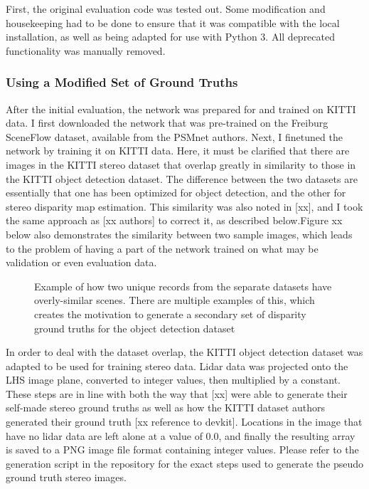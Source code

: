 First, the original evaluation code was tested out. Some modification and housekeeping had to be done to ensure that it was compatible with the local installation, as well as being adapted for use with Python 3. All deprecated functionality was manually removed.

\subsubsection{Using a Modified Set of Ground Truths}
After the initial evaluation, the network was prepared for and trained on KITTI data. I first downloaded the network that was pre-trained on the Freiburg SceneFlow dataset, available from the PSMnet authors. Next, I finetuned the network by training it on KITTI data. Here, it must be clarified that there are images in the KITTI stereo dataset that overlap greatly in similarity to those in the KITTI object detection dataset. The difference between the two datasets are essentially that one has been optimized for object detection, and the other for stereo disparity map estimation. This similarity was also noted in [xx], and I took the same approach as [xx authors] to correct it, as described below.Figure xx below also demonstrates the similarity between two sample images, which leads to the problem of having a part of the network trained on what may be validation or even evaluation data.

\begin{figure}[H]
    \centering
    \label{similarity_stereo_objdet}
    \caption{Example of how two unique records from the separate datasets have overly-similar scenes. There are multiple examples of this, which creates the motivation to generate a secondary set of disparity ground truths for the object detection dataset}
\end{figure}

In order to deal with the dataset overlap, the KITTI object detection dataset was adapted to be used for training stereo data. Lidar data was projected onto the LHS image plane, converted to integer values, then multiplied by a constant. These steps are in line with both the way that [xx] were able to generate their self-made stereo ground truths as well as how the KITTI dataset authors generated their ground truth [xx reference to devkit]. Locations in the image that have no lidar data are left alone at a value of 0.0, and finally the resulting array is saved to a PNG image file format containing integer values. Please refer to the generation script in the repository for the exact steps used to generate the pseudo ground truth stereo images.

